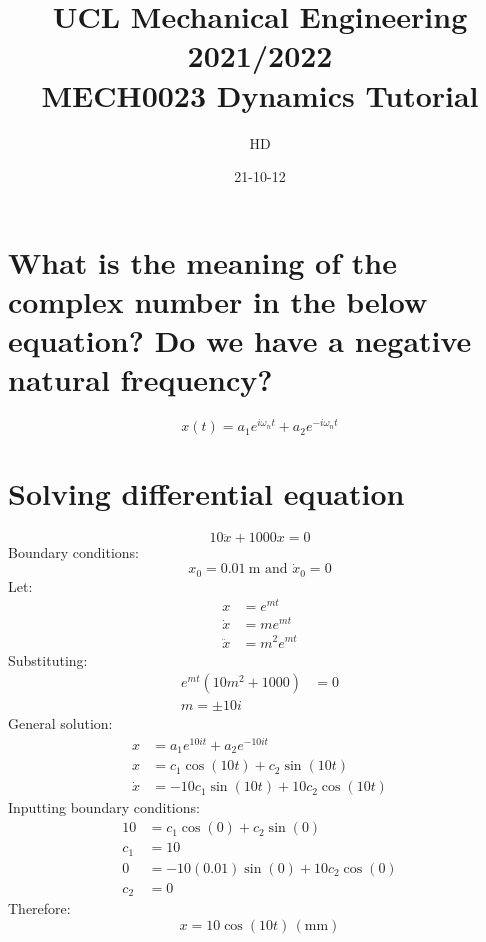 \documentclass[11pt]{article}
\begin{document}
\title{\textbf{UCL Mechanical Engineering 2021/2022}\\MECH0023 Dynamics Tutorial}
\author{HD}
\date{21-10-12}
\maketitle
\section{What is the meaning of the complex number in the below equation? Do we have a negative natural frequency?}
\begin{equation}
    x(t) = a_1 e^{i\omega_n t} + a_2 e^{-i\omega_n t}
\end{equation}
\section{Solving differential equation}
\begin{equation}
    10\ddot{x} + 1000x = 0
\end{equation}
Boundary conditions:
\begin{equation}
    x_0 = \SI{0.01}{\meter} \textrm{ and } \dot{x}_0 = 0
\end{equation}
Let:
\begin{align}
    x        & = e^{mt}     \\
    \dot{x}  & = me^{mt}    \\
    \ddot{x} & = m^2 e^{mt}
\end{align}
Substituting:
\begin{align}
    e^{mt}\left(10m^2 + 1000\right) & =0 \\
    m = \pm 10i
\end{align}
General solution:
\begin{align}
    x       & = a_1 e^{10it} + a_2 e^{-10it}                             \\
    x       & = c_1 \cos \left(10t\right) + c_2 \sin\left(10t\right)     \\
    \dot{x} & = -10c_1 \sin\left(10t\right) + 10c_2 \cos\left(10t\right)
\end{align}
Inputting boundary conditions:
\begin{align}
    10  & = c_1 \cos \left(0\right) + c_2 \sin\left(0\right)        \\
    c_1 & = 10                                                      \\
    0   & = -10(0.01) \sin\left(0\right) + 10c_2 \cos\left(0\right) \\
    c_2 & = 0
\end{align}
Therefore:
\begin{equation}
    x = 10\cos\left(10t\right) \, (\si{\milli\meter})
\end{equation}
\end{document}

